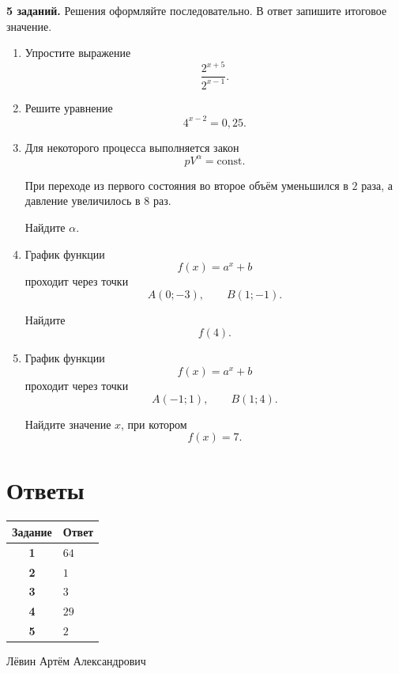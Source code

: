 \documentclass[a4paper,12pt]{article}
\begin{document}
\textbf{5 заданий.}
Решения оформляйте последовательно. В ответ запишите итоговое значение.

\begin{enumerate}[label=\textbf{\arabic*.}]

\item
Упростите выражение
\[
\frac{2^{x+5}}{2^{x-1}}.
\]

\item
Решите уравнение
\[
4^{x-2}=0{,}25.
\]

\item
Для некоторого процесса выполняется закон
\[
pV^\alpha=\text{const}.
\]

При переходе из первого состояния во второе объём уменьшился в \(2\) раза, а давление увеличилось в \(8\) раз.

Найдите \(\alpha\).

\item
График функции
\[
f(x)=a^x+b
\]
проходит через точки
\[
A(0;-3),
\qquad
B(1;-1).
\]

Найдите
\[
f(4).
\]

\item
График функции
\[
f(x)=a^x+b
\]
проходит через точки
\[
A(-1;1),
\qquad
B(1;4).
\]

Найдите значение \(x\), при котором
\[
f(x)=7.
\]

\end{enumerate}

\clearpage

\section*{Ответы}

\renewcommand{\arraystretch}{1.45}

\begin{table}[ht]
\centering
\begin{tabularx}{0.82\linewidth}{@{}>{\bfseries}c X@{}}
\toprule
Задание & Ответ \\
\midrule
1 & \(64\) \\
2 & \(1\) \\
3 & \(3\) \\
4 & \(29\) \\
5 & \(2\) \\
\bottomrule
\end{tabularx}
\end{table}

\vfill

\begin{center}
\color{softgray}
\small
Лёвин Артём Александрович
\end{center}
\end{document}
